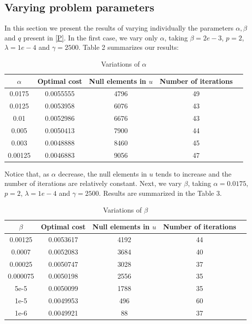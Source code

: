 \documentclass[11pt,a4paper]{amsart}
\begin{document}
\subsection{Varying problem parameters} In this section we present the results of varying individually the parameters $\alpha, \beta$ and $q$ present in \eqref{P}. In the first case, we vary only $\alpha$, taking $\beta=2e-3$, $p=2$, $\lambda=1e-4$ and $\gamma=2500$. Table 2 summarizes our results:
\begin{table}[h]
    \centering
    \begin{tabular}{|c|c|c|c|c|}
    \hline
    $\alpha$ & Optimal cost & Null elements in $u$ & Number of iterations\\
    \hline
    0.0175&0.0055555&4796&49\\
    0.0125&0.0053958&6076&43\\
    0.01  & 0.0052986 &6676  & 43  \\
    0.005 &0.0050413 &7900  &44\\
    0.003 &0.0048888 &8460  &45\\
    0.00125 & 0.0046883 & 9056 & 47\\
    \hline
    \end{tabular}
    \caption{Variations of $\alpha$}
\end{table}

Notice that, as $\alpha$ decrease, the null elements in $u$ tends to increase and the number of iterations are relatively constant. Next, we vary $\beta$, taking $\alpha=0.0175$, $p=2$, $\lambda=1e-4$ and $\gamma=2500$. Results are summarized in the Table 3.
\begin{table}[h]
    \centering
    \begin{tabular}{|c|c|c|c|c|}
    \hline
    $\beta$ & Optimal cost & Null elements in $u$ & Number of iterations\\
    \hline
    0.00125&0.0053617&4192&44\\
    0.0007&0.0052083&3684&40\\
    0.00025  & 0.0050747 &3028  & 37  \\
    0.000075&0.0050198&2556&35\\
    5e-5&0.0050099&1788&35\\
    1e-5 &0.0049953 &496  &60\\
    1e-6 &0.0049921 &88  &37\\    
    \hline
    \end{tabular}
    \caption{Variations of $\beta$}
\end{table}
\end{document}

